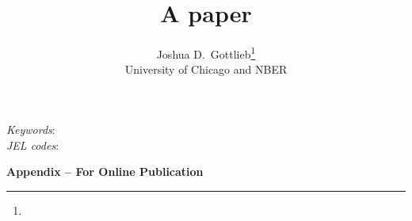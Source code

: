 \documentclass[11pt]{article}
\title{A paper}
\author{Joshua D.~Gottlieb\thanks{\gottliebemail} \\ University of Chicago and NBER}
\date{\monthname[\the\month] \the\year}
\begin{document}



\begin{abstract}
\end{abstract}
\vspace{1cm}
{\small
\noindent \textit{Keywords}:  \\
\textit{JEL codes}: 
}
\thispagestyle{empty}
\newpage
\setcounter{page}{1}



%
%
%


{}

\newpage
\clearpage

\begin{center} \Large \textbf{Appendix -- For Online Publication} \end{center}
\appendix
{}

%
%
%
\end{document}

